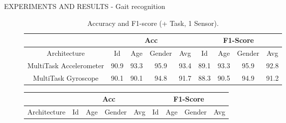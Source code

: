 \begin{frame}{EXPERIMENTS AND RESULTS - Gait recognition}
\begin{minipage}{\linewidth}
\begin{minipage}{0.45\linewidth}
\begin{table}[h!]
\begin{adjustbox}{max width=\textwidth}
                \end{adjustbox}
                \caption{Accuracy and F1-score (1 Task, + Sensor).}
                \label{table accuracy and F1 (1 Task, + Sensor)}
            \end{table}
        \end{minipage}
        \hspace{0.05\linewidth}
        \begin{minipage}{0.45\linewidth}
            \begin{figure}[htbp]
                \centering
                \begin{table}[h!]
                    \centering
                    \begin{adjustbox}{max width=\textwidth}
                    \begin{tabular}{|c||ccc|c||ccc|c|}
                        \hline
                            & \multicolumn{4}{c||}{Acc} & \multicolumn{4}{c|}{F1-Score} \\
                        \hline
                            Architecture & Id & Age & Gender & Avg & Id & Age & Gender & Avg\\
                        \hline
                            MultiTask Accelerometer & 90.9 & 93.3 & 95.9 & 93.4 & 89.1 & 93.3 & 95.9 & 92.8\\
                            MultiTask Gyroscope & 90.1 & 90.1 & 94.8 & 91.7 & 88.3 & 90.5 & 94.9 & 91.2\\
                        \hline 
                    \end{tabular}
                    \end{adjustbox}
                    \caption{Accuracy and F1-score (+ Task, 1 Sensor).}
                    \label{table accuracy and F1 (more Task - 1 Sensor)}
                \end{table}
                \centering
                \begin{table}[h!]
                    \centering
                    \begin{adjustbox}{max width=\textwidth}
                    \begin{tabular}{|c||ccc|c||ccc|c|}
                        \hline
                            & \multicolumn{4}{c||}{Acc} & \multicolumn{4}{c|}{F1-Score} \\
                        \hline
                            Architecture & Id & Age & Gender & Avg & Id & Age & Gender & Avg\\
                        \hline

\end{tabular}
\end{adjustbox}
\end{table}
\end{figure}
\end{minipage}
\end{minipage}
\end{frame}
